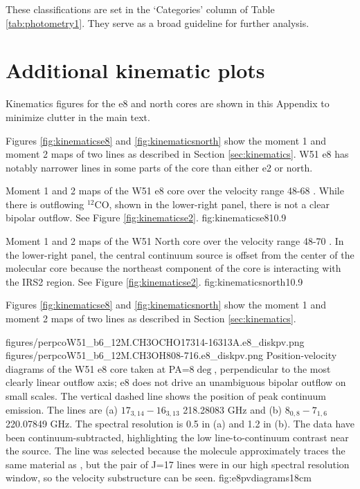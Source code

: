 \documentclass{emulateapj}
\begin{document}
These classifications are set in the `Categories' column of Table
\ref{tab:photometry1}.  They serve as a broad guideline for further
analysis.   



\section{Additional kinematic plots}
Kinematics figures for the e8 and north cores are shown in this Appendix to
minimize clutter in the main text.

Figures \ref{fig:kinematicse8} and \ref{fig:kinematicsnorth} show the moment 1
and moment 2 maps of two \methanol lines as described in Section
\ref{sec:kinematics}.  W51 e8 has notably narrower lines in some parts of 
the core than either e2 or north.

{Moment 1 and 2 maps of the W51 e8 core over the velocity
range 48-68 \kms.  While there is  outflowing $^{12}$CO, shown in the
lower-right panel, there is not a clear bipolar outflow. See Figure
\ref{fig:kinematicse2}.}
{fig:kinematicse8}{1}{0.9\textwidth}

{Moment 1 and 2 maps of the W51 North core over the velocity
range 48-70 \kms.  In the lower-right panel, the central
continuum source is offset from the center of the molecular core
because the northeast component of the core is interacting
with the IRS2 \hii region. See Figure \ref{fig:kinematicse2}.}
{fig:kinematicsnorth}{1}{0.9\textwidth}

Figures \ref{fig:kinematicse8} and \ref{fig:kinematicsnorth} show the moment 1
and moment 2 maps of two \methanol lines as described in Section
\ref{sec:kinematics}.

\FigureTwo
{figures/perpcoW51_b6_12M.CH3OCHO17314-16313A.e8_diskpv.png}
{figures/perpcoW51_b6_12M.CH3OH808-716.e8_diskpv.png}
{Position-velocity diagrams of the W51 e8 core taken at PA=$8\deg$,
perpendicular to the most clearly linear outflow axis; e8 does not drive an
unambiguous bipolar outflow on small scales.  The vertical dashed line shows the
position of peak continuum emission. The lines are (a) \methylformate
$17_{3,14}-16_{3,13}$ 218.28083 GHz and (b) \methanol $8_{0,8}-7_{1,6}$
220.07849 GHz.  The spectral resolution is 0.5 \kms in (a) and 1.2 \kms in (b).
The data have been continuum-subtracted, highlighting the low line-to-continuum
contrast near the source.  The \methylformate line was selected because the
molecule approximately traces the same material as \methanol, but the pair of
\methylformate J=17 lines were in our high spectral resolution window, so the
velocity substructure can be seen.
}
{fig:e8pvdiagrams}{1}{8cm}
\end{document}
